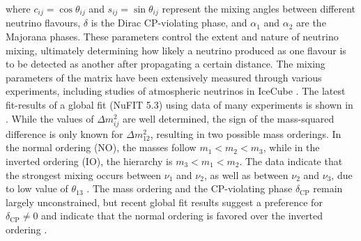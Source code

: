 where $c_{ij} = \cos\theta_{ij}$ and $s_{ij} = \sin\theta_{ij}$ represent the mixing angles between different neutrino flavours, $\delta$ is the Dirac CP-violating phase, and $\alpha_1$ and $\alpha_2$ are the Majorana phases. These parameters control the extent and nature of neutrino mixing, ultimately determining how likely a neutrino produced as one flavour is to be detected as another after propagating a certain distance. The mixing parameters of the matrix have been extensively measured through various experiments, including studies of atmospheric neutrinos in IceCube . The latest fit-results of a global fit (NuFIT 5.3)  using data of many experiments is shown in . While the values of $\Delta m^2_{ij}$ are well determined, the sign of the mass-squared difference is only known for $\Delta m^2_{12}$, resulting in two possible mass orderings. In the normal ordering (NO), the masses follow $m_1 < m_2 < m_3$, while in the inverted ordering (IO), the hierarchy is $m_3 < m_1 < m_2$. The data indicate that the strongest mixing occurs between $\nu_1$ and $\nu_2$, as well as between $\nu_2$ and $\nu_3$, due to low value of $\theta_{13}$ \cite{Esteban:2020cvm}. The mass ordering and the CP-violating phase $\delta_{\text{CP}}$ remain largely unconstrained, but recent global fit results suggest a preference for $\delta_{\text{CP}} \neq 0$ and indicate that the normal ordering is favored over the inverted ordering \cite{Esteban:2020cvm}.

